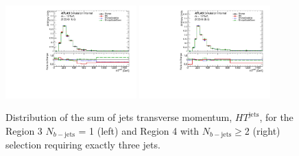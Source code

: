 \begin{figure}[!htb]
\centering
\includegraphics[width=0.45\textwidth]{Plots/ttV/shape/c_Region_2_HT_jets}
\includegraphics[width=0.45\textwidth]{Plots/ttV/shape/c_Region_3_HT_jets}\\
  \caption{Distribution of the sum of jets transverse momentum, $HT^{\text{jets}}$, for the Region 3 $N_{b-\mathrm{jets}}$ = 1 (left) and Region 4 with $N_{b-\mathrm{jets}}\geq$2 (right) selection requiring exactly three jets.  \label{ttV:3j12b}}
\end{figure}


